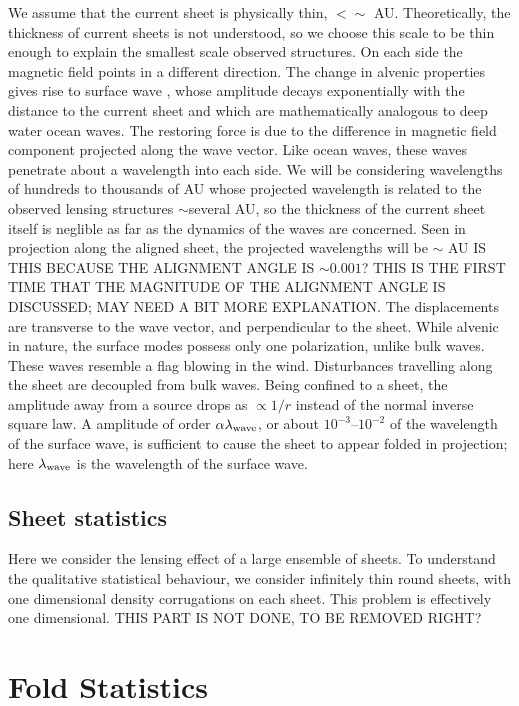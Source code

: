 \documentclass[useAMS,usenatbib]{mn2e}
\begin{document}
We assume that the current sheet is physically thin, $< \sim $ AU.  Theoretically,
the thickness of current sheets is not understood, so we choose this
scale to be thin enough to explain the smallest scale observed
structures.  On each side the
magnetic field points in a different direction.  The change in alvenic
properties gives rise to surface
wave \citep{1991SoPh..133..263J, 2009GApFD.103...89J}, whose amplitude
decays exponentially with the distance to the current sheet and which are
mathematically analogous to deep water ocean waves.  The restoring force is due to the
difference in magnetic field component projected along the wave
vector.  Like ocean waves, these waves penetrate about a wavelength
into each side.  We will be considering wavelengths of hundreds to thousands of
AU whose projected wavelength is related to the observed lensing
structures  $\sim$several AU, so the thickness of the current sheet itself is
neglible as far as the dynamics of 
the waves are concerned.  Seen in projection along the aligned sheet,
the projected wavelengths will be $\sim $ AU IS THIS BECAUSE THE ALIGNMENT ANGLE IS
$\sim 0.001$?  THIS IS THE FIRST TIME THAT THE MAGNITUDE OF THE ALIGNMENT ANGLE
IS DISCUSSED; MAY NEED A BIT MORE EXPLANATION.  The displacements are
transverse to the wave vector, and perpendicular to the sheet.  While
alvenic in nature, the surface modes possess only one polarization,
unlike bulk waves.  These waves resemble a flag blowing in the wind.
Disturbances travelling along the sheet are decoupled from bulk waves.
Being confined to a sheet, the amplitude away from a source drops as
$\propto 1/r$ instead of the normal inverse square law.  A amplitude
of order $\alpha \lambda_{\rm wave}$,   or about $10^{-3}$--$10^{-2}$ of the wavelength
of the surface wave, is
sufficient to cause the sheet to appear folded in projection; here $\lambda_{\rm wave}$ is the wavelength of the surface wave.

\subsection{Sheet statistics}

Here we consider the lensing effect of a large ensemble of sheets.  To
understand the qualitative statistical behaviour, we consider
infinitely thin round sheets, with one dimensional density
corrugations on each sheet.  This problem is effectively one dimensional.
THIS PART IS NOT DONE, TO BE REMOVED RIGHT?

\section{Fold Statistics}
\end{document}
